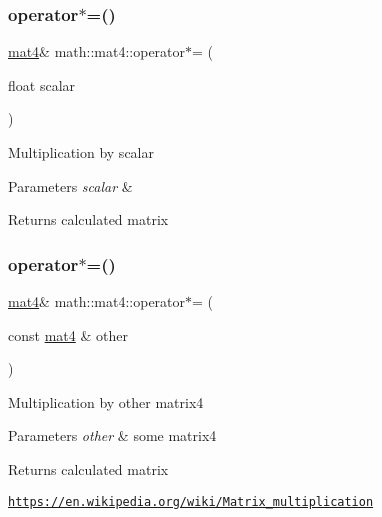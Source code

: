 \subsubsection{\texorpdfstring{operator$\ast$=()}{operator*=()}\hspace{0.1cm}{\footnotesize\ttfamily [1/2]}}
{\footnotesize\ttfamily \hyperlink{structmath_1_1mat4}{mat4}\& math\+::mat4\+::operator$\ast$= (\begin{DoxyParamCaption}\item[{float}]{scalar }\end{DoxyParamCaption})\hspace{0.3cm}{\ttfamily [inline]}}

Multiplication by scalar 
\begin{DoxyParams}{Parameters}
{\em scalar} & \\
\hline
\end{DoxyParams}
\begin{DoxyReturn}{Returns}
calculated matrix 
\end{DoxyReturn}
\mbox{\label{structmath_1_1mat4_af26f144e357f0c2597afe7c0df3f366d}} 
\subsubsection{\texorpdfstring{operator$\ast$=()}{operator*=()}\hspace{0.1cm}{\footnotesize\ttfamily [2/2]}}
{\footnotesize\ttfamily \hyperlink{structmath_1_1mat4}{mat4}\& math\+::mat4\+::operator$\ast$= (\begin{DoxyParamCaption}\item[{const \hyperlink{structmath_1_1mat4}{mat4} \&}]{other }\end{DoxyParamCaption})\hspace{0.3cm}{\ttfamily [inline]}}

Multiplication by other matrix4 
\begin{DoxyParams}{Parameters}
{\em other} & some matrix4 \\
\hline
\end{DoxyParams}
\begin{DoxyReturn}{Returns}
calculated matrix
\end{DoxyReturn}
\href{https://en.wikipedia.org/wiki/Matrix_multiplication}{\tt https\+://en.\+wikipedia.\+org/wiki/\+Matrix\+\_\+multiplication} \mbox{\label{structmath_1_1mat4_a54330fc77b83773e0270c98c3ffb7809}} 
